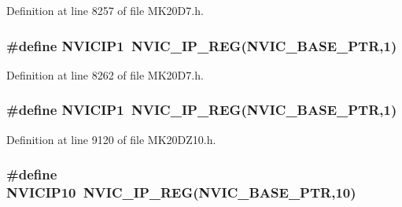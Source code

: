 Definition at line 8257 of file M\+K20\+D7.\+h.

\subsubsection[{\texorpdfstring{N\+V\+I\+C\+I\+P1}{NVICIP1}}]{\setlength{\rightskip}{0pt plus 5cm}\#define N\+V\+I\+C\+I\+P1~{\bf N\+V\+I\+C\+\_\+\+I\+P\+\_\+\+R\+EG}({\bf N\+V\+I\+C\+\_\+\+B\+A\+S\+E\+\_\+\+P\+TR},1)}\hypertarget{group___n_v_i_c___register___accessor___macros_ga89b9108995b1c16f426a9ff18f3556cf}{}\label{group___n_v_i_c___register___accessor___macros_ga89b9108995b1c16f426a9ff18f3556cf}


Definition at line 8262 of file M\+K20\+D7.\+h.

\subsubsection[{\texorpdfstring{N\+V\+I\+C\+I\+P1}{NVICIP1}}]{\setlength{\rightskip}{0pt plus 5cm}\#define N\+V\+I\+C\+I\+P1~{\bf N\+V\+I\+C\+\_\+\+I\+P\+\_\+\+R\+EG}({\bf N\+V\+I\+C\+\_\+\+B\+A\+S\+E\+\_\+\+P\+TR},1)}\hypertarget{group___n_v_i_c___register___accessor___macros_ga89b9108995b1c16f426a9ff18f3556cf}{}\label{group___n_v_i_c___register___accessor___macros_ga89b9108995b1c16f426a9ff18f3556cf}


Definition at line 9120 of file M\+K20\+D\+Z10.\+h.

\subsubsection[{\texorpdfstring{N\+V\+I\+C\+I\+P10}{NVICIP10}}]{\setlength{\rightskip}{0pt plus 5cm}\#define N\+V\+I\+C\+I\+P10~{\bf N\+V\+I\+C\+\_\+\+I\+P\+\_\+\+R\+EG}({\bf N\+V\+I\+C\+\_\+\+B\+A\+S\+E\+\_\+\+P\+TR},10)}\hypertarget{group___n_v_i_c___register___accessor___macros_ga7a8c043dca03fa0e80e157be6e9a56a7}{}\label{group___n_v_i_c___register___accessor___macros_ga7a8c043dca03fa0e80e157be6e9a56a7}


